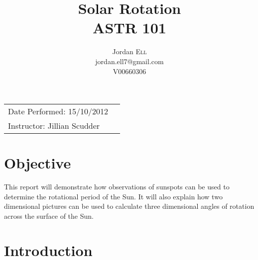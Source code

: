 \documentclass{article}
\title{Solar Rotation \\ ASTR 101} %
\author{Jordan \textsc{Ell} \\ jordan.ell7@gmail.com \\ V00660306} %
\begin{document}
\maketitle %

\begin{tabular}{lr}
Date Performed: 15/10/2012\\ %
Instructor: Jillian Scudder %
\end{tabular}

\setlength\parindent{0pt} %

\renewcommand{\labelenumi}{\alph{enumi}.} %


\section{Objective}

This report will demonstrate how observations of sunspots can be used to determine the rotational period of the Sun. It will
also explain how two dimensional pictures can be used to calculate three dimensional angles of rotation across the surface 
of the Sun.\\
 

\section{Introduction}
\end{document}

